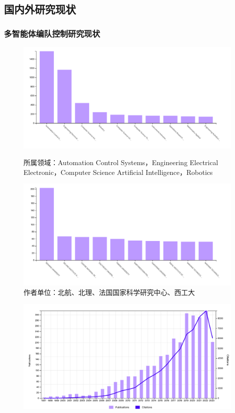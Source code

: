 \documentclass{beamer}
\theoremstyle{remark}
\begin{document}
\subsection{国内外研究现状}
\begin{frame}
	\frametitle{多智能体编队控制研究现状}
	\begin{figure}[htbp]
		\centering
		\begin{minipage}[c]{0.5\textwidth} 
			\centering
			\includegraphics[width=0.8\linewidth]{Fig/formation Control of multi agent _filed.jpg}
			\caption{所属领域：Automation Control Systems，Engineering Electrical Electronic，Computer Science Artificial Intelligence，Robotics}
		\end{minipage}%
		\begin{minipage}[c]{0.5\textwidth}
			\centering
			\includegraphics[width=0.8\linewidth]{Fig/formation Control of multi agent _affiliation.jpg}
			\caption{作者单位：北航、北理、法国国家科学研究中心、西工大}
		\end{minipage}
	\end{figure}	
	\begin{figure}[htbp]
		\centering
		\begin{minipage}[c]{0.5\textwidth} 
			\centering
			\includegraphics[width=0.8\linewidth]{Fig/formation Control of multi agent _all.jpg}

\end{minipage}
\end{figure}
\end{frame}
\end{document}
